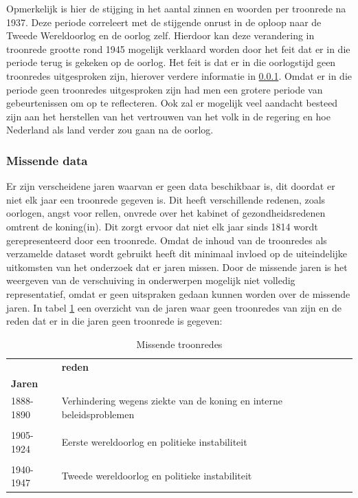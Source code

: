 Opmerkelijk is hier de stijging in het aantal zinnen en woorden per troonrede na 1937. Deze periode correleert met de stijgende onrust in de oploop naar de Tweede Wereldoorlog en de oorlog zelf. Hierdoor kan deze verandering in troonrede grootte rond 1945 mogelijk verklaard worden door het feit dat er in die periode terug is gekeken op de oorlog. Het feit is dat er in die oorlogstijd geen troonredes uitgesproken zijn, hierover verdere informatie in \ref{sssec 1}. Omdat er in die periode geen troonredes uitgesproken zijn had men een grotere periode van gebeurtenissen om op te reflecteren. Ook zal er mogelijk veel aandacht besteed zijn aan het herstellen van het vertrouwen van het volk in de regering en hoe Nederland als land verder zou gaan na de oorlog. 

\subsubsection{Missende data} \label{sssec 1}
Er zijn verscheidene jaren waarvan er geen data beschikbaar is, dit doordat er niet elk jaar een troonrede gegeven is. Dit heeft verschillende redenen, zoals oorlogen, angst voor rellen, onvrede over het kabinet of gezondheidsredenen omtrent de koning(in). Dit zorgt ervoor dat niet elk jaar sinds 1814 wordt gerepresenteerd door een troonrede. Omdat de inhoud van de troonredes als verzamelde dataset wordt gebruikt heeft dit minimaal invloed op de uiteindelijke uitkomsten van het onderzoek dat er jaren missen. Door de missende jaren is het weergeven van de verschuiving in onderwerpen mogelijk niet volledig representatief, omdat er geen uitspraken gedaan kunnen worden over de missende jaren.
In tabel \ref{missing} een overzicht van de jaren waar geen troonredes van zijn en de reden dat er in die jaren geen troonrede is gegeven:

\begin{table}[H]
\centering
\begin{tabular}{ll}
\toprule
{} &                       \textbf{reden} \\
\textbf{Jaren}     &                             \\
\midrule
1888-1890 &  Verhindering wegens ziekte van de koning en interne beleidsproblemen\\
\\
1905-1924 &         Eerste wereldoorlog en politieke instabiliteit\\
\\
1940-1947 &         Tweede wereldoorlog en politieke instabiliteit\\
\bottomrule
\end{tabular}
\caption{Missende troonredes}
\label{missing}
\end{table}

